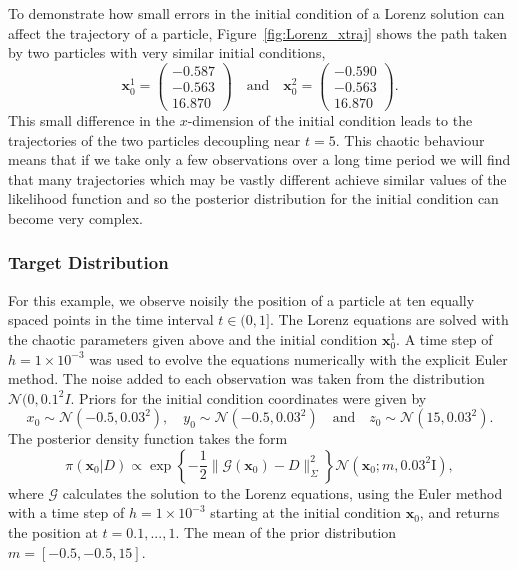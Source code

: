 \documentclass[final]{siamltex}
\begin{document}
To demonstrate how small errors in the initial condition of a Lorenz solution can affect the trajectory of a particle, Figure~\ref{fig:Lorenz_xtraj} shows the path taken by two particles with very similar initial conditions,
\[
	\mathbf{x}_0^1 = \begin{pmatrix} -0.587\\-0.563\\16.870 \end{pmatrix} \quad \text{and} \quad \mathbf{x}_0^2 = \begin{pmatrix} -0.590\\-0.563\\16.870 \end{pmatrix}.
\]
This small difference in the $x$-dimension of the initial condition leads to the trajectories of the two particles decoupling near $t=5$. This chaotic behaviour means that if we take only a few observations over a long time period we will find that many trajectories which may be vastly different achieve similar values of the likelihood function and so the posterior distribution for the initial condition can become very complex.%

\subsubsection{Target Distribution}\label{sec:lorenz_target}

For this example, we observe noisily the position of a particle at ten
equally spaced points in the time interval $t \in (0, 1]$. The Lorenz
equations are solved with the chaotic parameters given above and the
initial condition $\mathbf{x}_0^1$. A time step of $h=1\times 10^{-3}$
was used to evolve the equations numerically with the explicit Euler
method. The noise added to each observation was taken from the
distribution $\mathcal{N}(0, 0.1^2I$. Priors for the initial condition
coordinates were given by
\[
	x_0 \sim \mathcal{N}(-0.5, 0.03^2), \quad y_0 \sim\mathcal{N}(-0.5, 0.03^2) \quad \text{and} \quad z_0 \sim \mathcal{N}(15, 0.03^2).
\]
The posterior density function takes the form
\[
	\pi(\mathbf{x}_0|D) \propto \exp\left\{-\frac{1}{2}\|\mathcal{G}(\mathbf{x}_0) - D\|^2_\Sigma\right\}\mathcal{N}(\mathbf{x}_0; m, 0.03^2\text{I}),
\]
where $\mathcal{G}$ calculates the solution to the Lorenz equations, using the Euler method with a time step of $h=1\times 10^{-3}$ starting at the initial condition $\mathbf{x}_0$, and returns the position at $t = 0.1, ..., 1$. The mean of the prior distribution $m = [-0.5, -0.5, 15]$.
\end{document}
